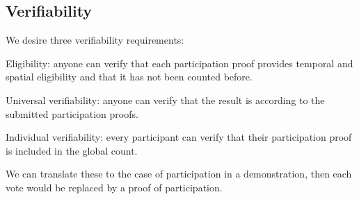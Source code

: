 

\subsection{Verifiability}%
\label{Verifiability}

We desire three verifiability requirements:
\begin{requirements}[V]
\item\label{EligibilityVerif} Eligibility: anyone can verify that each 
  participation proof provides temporal and spatial eligibility and that it has 
  not been counted before.
\item\label{UniversalVerif} Universal verifiability: anyone can verify that the 
  result is according to the submitted participation proofs.
\item\label{IndividualVerif} Individual verifiability: every participant can 
  verify that their participation proof is included in the global count.
\end{requirements}
We can translate these to the case of participation in a demonstration, then 
each vote would be replaced by a proof of participation.


